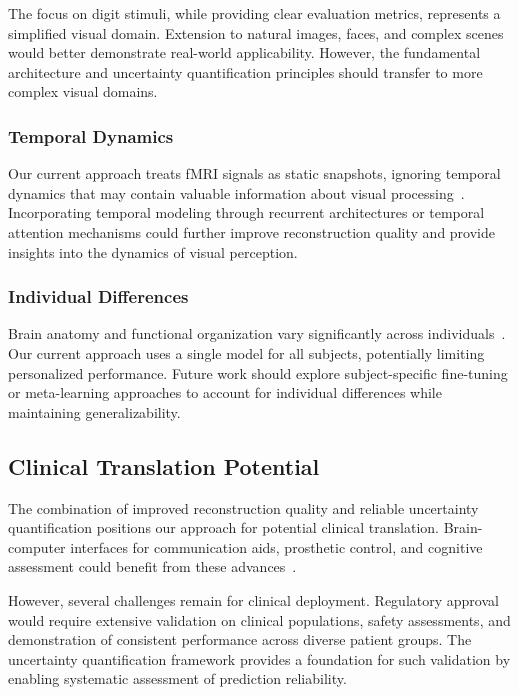 The focus on digit stimuli, while providing clear evaluation metrics, represents a simplified visual domain. Extension to natural images, faces, and complex scenes would better demonstrate real-world applicability. However, the fundamental architecture and uncertainty quantification principles should transfer to more complex visual domains.

\subsubsection{Temporal Dynamics}

Our current approach treats fMRI signals as static snapshots, ignoring temporal dynamics that may contain valuable information about visual processing~\cite{cichy2014resolving}. Incorporating temporal modeling through recurrent architectures or temporal attention mechanisms could further improve reconstruction quality and provide insights into the dynamics of visual perception.

\subsubsection{Individual Differences}

Brain anatomy and functional organization vary significantly across individuals~\cite{finn2015functional}. Our current approach uses a single model for all subjects, potentially limiting personalized performance. Future work should explore subject-specific fine-tuning or meta-learning approaches to account for individual differences while maintaining generalizability.

\subsection{Clinical Translation Potential}

The combination of improved reconstruction quality and reliable uncertainty quantification positions our approach for potential clinical translation. Brain-computer interfaces for communication aids, prosthetic control, and cognitive assessment could benefit from these advances~\cite{wolpaw2002brain,lebedev2006brain}.

However, several challenges remain for clinical deployment. Regulatory approval would require extensive validation on clinical populations, safety assessments, and demonstration of consistent performance across diverse patient groups. The uncertainty quantification framework provides a foundation for such validation by enabling systematic assessment of prediction reliability.

